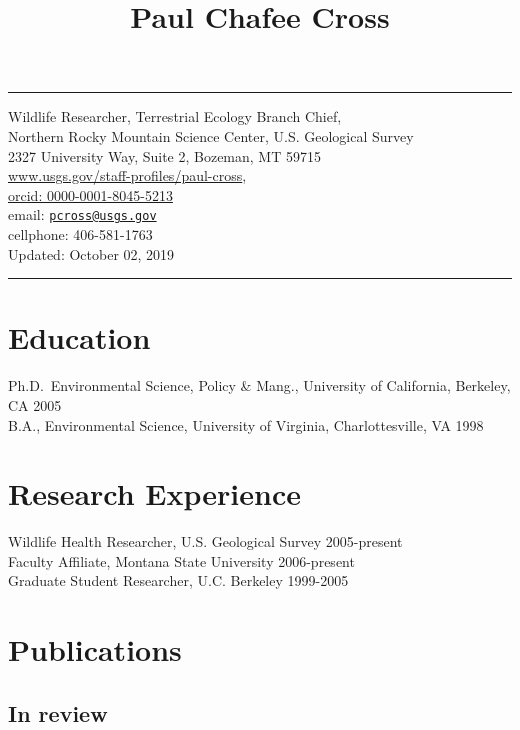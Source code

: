 \documentclass[12pt,]{article}
\title{Paul Chafee Cross}
\author{}
\date{}
\begin{document}
\maketitle

\hrule
\centering

Wildlife Researcher, Terrestrial Ecology Branch Chief,\\
Northern Rocky Mountain Science Center, U.S. Geological Survey\\
2327 University Way, Suite 2, Bozeman, MT 59715\\
\href{http://www.usgs.gov/staff-profiles/paul-cross}{www.usgs.gov/staff-profiles/paul-cross},\\
\href{http://orcid.org/0000-0001-8045-5213}{orcid:
0000-0001-8045-5213}\\
email: \href{mailto:pcross@usgs.gov}{\nolinkurl{pcross@usgs.gov}}\\
cellphone: 406-581-1763\\
Updated: October 02, 2019

\hrule

\raggedright

\hypertarget{education}{%
\section{Education}\label{education}}

Ph.D.~Environmental Science, Policy \& Mang., University of California,
Berkeley, CA \hfill 2005\\
B.A., Environmental Science, University of Virginia, Charlottesville, VA
\hfill 1998

\hypertarget{research-experience}{%
\section{Research Experience}\label{research-experience}}

Wildlife Health Researcher, U.S. Geological Survey \hfill 2005-present\\
Faculty Affiliate, Montana State University \hfill 2006-present\\
Graduate Student Researcher, U.C. Berkeley \hfill 1999-2005

\hypertarget{publications}{%
\section{Publications}\label{publications}}

\hypertarget{in-review}{%
\subsection{In review}\label{in-review}}
\end{document}
